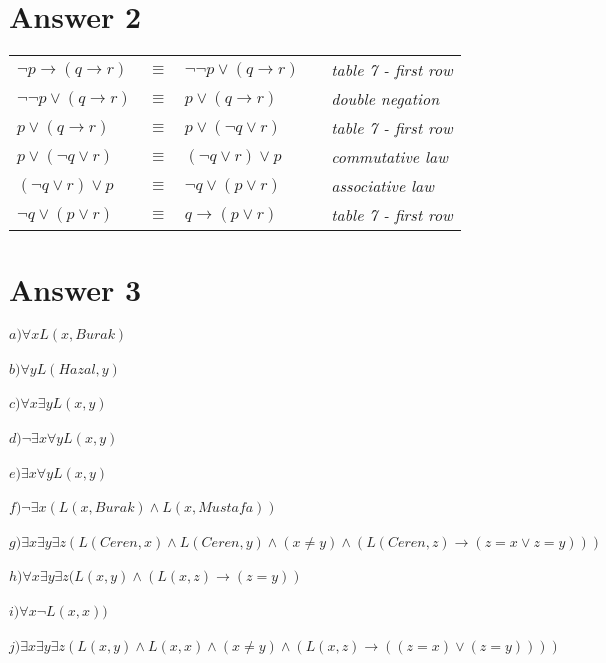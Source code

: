 \documentclass[12pt]{article}
\begin{document}
\section*{Answer 2}
\begin{table}[H]
    \centering
    \begin{tabular}{*5{l}}
        $\neg p \rightarrow (q \rightarrow r)$ & $\equiv$ & $\neg \neg p \vee (q \rightarrow r)$ & & \textit{table 7 - first row} \\
        $\neg \neg p \vee (q \rightarrow r)$ & $\equiv$ & $p \vee (q \rightarrow r)$ & & \textit{double negation} \\
        $p \vee (q \rightarrow r)$ & $\equiv$ & $p \vee (\neg q \vee r)$ & & \textit{table 7 - first row} \\
        $p \vee (\neg q \vee r)$ & $\equiv$ & $(\neg q \vee r) \vee p$ & & \textit{commutative law} \\
        $(\neg q \vee r) \vee p$ & $\equiv$ & $\neg q \vee (p \vee r)$ & & \textit{associative law} \\
        $\neg q \vee (p \vee r)$ & $\equiv$ & $q \rightarrow (p \vee r)$ & & \textit{table 7 - first row}
    \end{tabular}
\end{table}

\section*{Answer 3}
$a) \forall x L(x, Burak)$ \\ \\
$b) \forall y L(Hazal, y)$ \\ \\
$c) \forall x \exists y L(x, y)$ \\ \\
$d) \neg \exists x \forall y L(x,y)$ \\ \\
$e) \exists x \forall y L(x, y)$ \\ \\
$f) \neg \exists x (L(x, Burak) \wedge L(x, Mustafa))$ \\ \\
$g) \exists x \exists y \exists z (L(Ceren, x) \wedge L(Ceren, y) \wedge (x \neq y) \wedge (L(Ceren, z) \rightarrow (z = x \vee z = y)))$ \\ \\
$h) \forall x \exists y \exists z (L(x, y) \wedge (L(x, z) \rightarrow (z = y))$ \\ \\
$i) \forall x \neg L(x, x))$ \\ \\
$j) \exists x \exists y \exists z (L(x,y) \wedge L(x, x) \wedge (x \neq y) \wedge (L(x,z) \rightarrow ((z=x) \vee (z=y))))$ \\ \\
\end{document}
